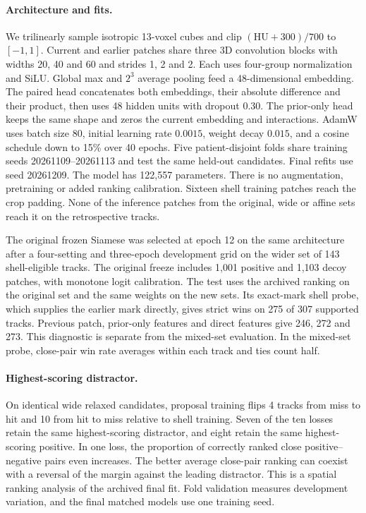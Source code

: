 \paragraph{Architecture and fits.}
We trilinearly sample isotropic 13-voxel cubes and clip $(\mathrm{HU}+300)/700$ to $[-1,1]$. Current and earlier patches share three 3D convolution blocks with widths 20, 40 and 60 and strides 1, 2 and 2. Each uses four-group normalization and SiLU. Global max and $2^3$ average pooling feed a 48-dimensional embedding. The paired head concatenates both embeddings, their absolute difference and their product, then uses 48 hidden units with dropout 0.30. The prior-only head keeps the same shape and zeros the current embedding and interactions. AdamW uses batch size 80, initial learning rate $0.0015$, weight decay $0.015$, and a cosine schedule down to 15\% over 40 epochs. Five patient-disjoint folds share training seeds 20261109--20261113 and test the same held-out candidates. Final refits use seed 20261209. The model has 122,557 parameters. There is no augmentation, pretraining or added ranking calibration. Sixteen shell training patches reach the crop padding. None of the inference patches from the original, wide or affine sets reach it on the retrospective tracks.

The original frozen Siamese was selected at epoch 12 on the same architecture after a four-setting and three-epoch development grid on the wider set of 143 shell-eligible tracks. The original freeze includes 1,001 positive and 1,103 decoy patches, with monotone logit calibration. The test uses the archived ranking on the original set and the same weights on the new sets. Its exact-mark shell probe, which supplies the earlier mark directly, gives strict wins on 275 of 307 supported tracks. Previous patch, prior-only features and direct features give 246, 272 and 273. This diagnostic is separate from the mixed-set evaluation. In the mixed-set probe, close-pair win rate averages within each track and ties count half.

\paragraph{Highest-scoring distractor.}
On identical wide relaxed candidates, proposal training flips 4 tracks from miss to hit and 10 from hit to miss relative to shell training. Seven of the ten losses retain the same highest-scoring distractor, and eight retain the same highest-scoring positive. In one loss, the proportion of correctly ranked close positive--negative pairs even increases. The better average close-pair ranking can coexist with a reversal of the margin against the leading distractor. This is a spatial ranking analysis of the archived final fit. Fold validation measures development variation, and the final matched models use one training seed.

